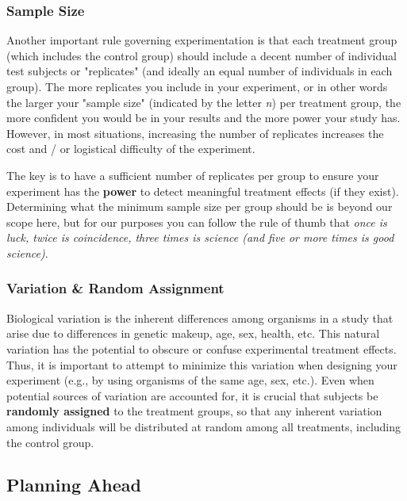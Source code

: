 \documentclass[
]{book}
\begin{document}
\hypertarget{sample-size}{%
\subsubsection*{Sample Size}\label{sample-size}}

Another important rule governing experimentation is that each treatment group (which includes the control group) should include a decent number of individual test subjects or "replicates" (and ideally an equal number of individuals in each group). The more replicates you include in your experiment, or in other words the larger your "sample size" (indicated by the letter \emph{n}) per treatment group, the more confident you would be in your results and the more power your study has. However, in most situations, increasing the number of replicates increases the cost and / or logistical difficulty of the experiment.

The key is to have a sufficient number of replicates per group to ensure your experiment has the \textbf{power} to detect meaningful treatment effects (if they exist). Determining what the minimum sample size per group should be is beyond our scope here, but for our purposes you can follow the rule of thumb that \emph{once is luck, twice is coincidence, three times is science (and five or more times is good science)}.

\hypertarget{variation-random-assignment}{%
\subsubsection*{Variation \& Random Assignment}\label{variation-random-assignment}}

Biological variation is the inherent differences among organisms in a study that arise due to differences in genetic makeup, age, sex, health, etc. This natural variation has the potential to obscure or confuse experimental treatment effects. Thus, it is important to attempt to minimize this variation when designing your experiment (e.g., by using organisms of the same age, sex, etc.). Even when potential sources of variation are accounted for, it is crucial that subjects be \textbf{randomly assigned} to the treatment groups, so that any inherent variation among individuals will be distributed at random among all treatments, including the control group.

\hypertarget{planning-ahead}{%
\subsection*{Planning Ahead}\label{planning-ahead}}
\end{document}
